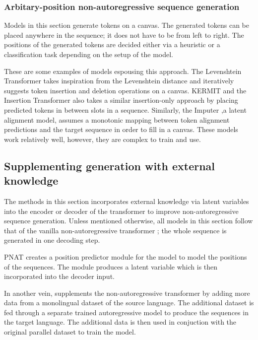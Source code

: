\subsubsection{Arbitary-position non-autoregressive sequence generation} \label{subsubsec:sol3_iterative_generation_arbirtary_position}
Models in this section generate tokens on a canvas. The generated tokens can be placed anywhere in the sequence; it does not have to be from left to right. The positions of the generated tokens are decided either via a heuristic or a classification task depending on the setup of the model. 

These are some examples of models espousing this approach. The Levenshtein Transformer \cite{gu_levenshtein_2019} takes inspiration from the Levenshtein distance \cite{Levenshtein1965BinaryCC_lev_distance} and iteratively suggests token insertion and deletion operations on a canvas. KERMIT \cite{chan_kermit_2019, chan_multilingual_kermit} and the Insertion Transformer \cite{stern_insertion_2019} also takes a similar insertion-only approach by placing predicted tokens in between slots in a sequence.  Similarly, the Imputer \cite{chan_imputer_2020},a latent alignment model, assumes a monotonic mapping between token alignment predictions and the target sequence in order to fill in a canvas. These models work relatively well, however, they are complex to train and use.


\subsection{Supplementing generation with external knowledge} \label{subsec:sol4_external_knowledge}
The methods in this section incorporates external knowledge via latent variables into the encoder or decoder of the transformer to improve non-autoregressive sequence generation. Unless mentioned otherwise, all models in this section follow that of the vanilla non-autoregressive transformer \cite{gu_non-autoregressive_2018}; the whole sequence is generated in one decoding step. 

PNAT \cite{bao_non-autoregressive_2019_position_learning} creates a position predictor module for the model to model the positions of the sequences. The module produces a latent variable which is then incorporated into the decoder input.

In another vein, \textcite{zhou_improving_2020_with_monolingual_data} supplements the non-autoregressive transformer by adding more data from a monolingual dataset of the source language. The additional dataset is fed through a separate trained autoregressive model to produce the sequences in the target language. The additional data is then used in conjuction with the original parallel dataset to train the model.

